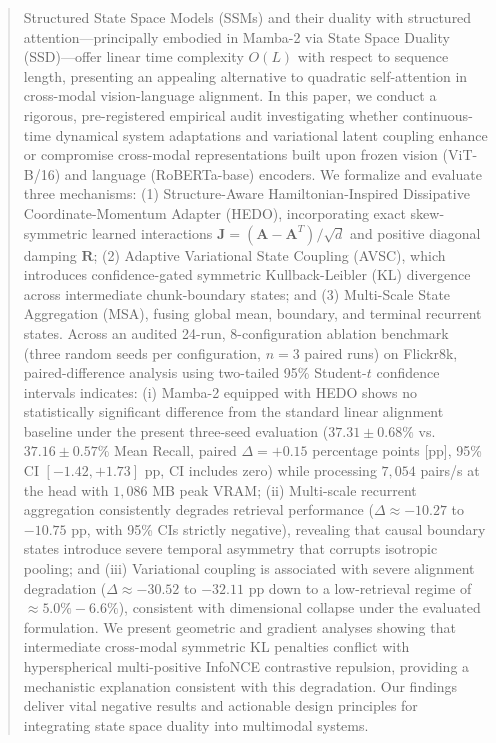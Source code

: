 \documentclass[10pt,journal,final]{IEEEtran}
\begin{document}
\begin{abstract}
Structured State Space Models (SSMs) and their duality with structured attention---principally embodied in Mamba-2 via State Space Duality (SSD)---offer linear time complexity $O(L)$ with respect to sequence length, presenting an appealing alternative to quadratic self-attention in cross-modal vision-language alignment. In this paper, we conduct a rigorous, pre-registered empirical audit investigating whether continuous-time dynamical system adaptations and variational latent coupling enhance or compromise cross-modal representations built upon frozen vision (ViT-B/16) and language (RoBERTa-base) encoders. We formalize and evaluate three mechanisms: (1) Structure-Aware Hamiltonian-Inspired Dissipative Coordinate-Momentum Adapter (HEDO), incorporating exact skew-symmetric learned interactions $\mathbf{J} = (\mathbf{A} - \mathbf{A}^T)/\sqrt{d}$ and positive diagonal damping $\mathbf{R}$; (2) Adaptive Variational State Coupling (AVSC), which introduces confidence-gated symmetric Kullback-Leibler (KL) divergence across intermediate chunk-boundary states; and (3) Multi-Scale State Aggregation (MSA), fusing global mean, boundary, and terminal recurrent states. Across an audited 24-run, 8-configuration ablation benchmark (three random seeds per configuration, $n=3$ paired runs) on Flickr8k, paired-difference analysis using two-tailed 95\% Student-$t$ confidence intervals indicates: (i) Mamba-2 equipped with HEDO shows no statistically significant difference from the standard linear alignment baseline under the present three-seed evaluation ($37.31 \pm 0.68\%$ vs. $37.16 \pm 0.57\%$ Mean Recall, paired $\Delta = +0.15$ percentage points [pp], 95\% CI $[-1.42, +1.73]$ pp, CI includes zero) while processing $7,054$ pairs/s at the head with $1,086$ MB peak VRAM; (ii) Multi-scale recurrent aggregation consistently degrades retrieval performance ($\Delta \approx -10.27$ to $-10.75$ pp, with 95\% CIs strictly negative), revealing that causal boundary states introduce severe temporal asymmetry that corrupts isotropic pooling; and (iii) Variational coupling is associated with severe alignment degradation ($\Delta \approx -30.52$ to $-32.11$ pp down to a low-retrieval regime of $\approx 5.0\%-6.6\%$), consistent with dimensional collapse under the evaluated formulation. We present geometric and gradient analyses showing that intermediate cross-modal symmetric KL penalties conflict with hyperspherical multi-positive InfoNCE contrastive repulsion, providing a mechanistic explanation consistent with this degradation. Our findings deliver vital negative results and actionable design principles for integrating state space duality into multimodal systems.
\end{abstract}
\end{document}
